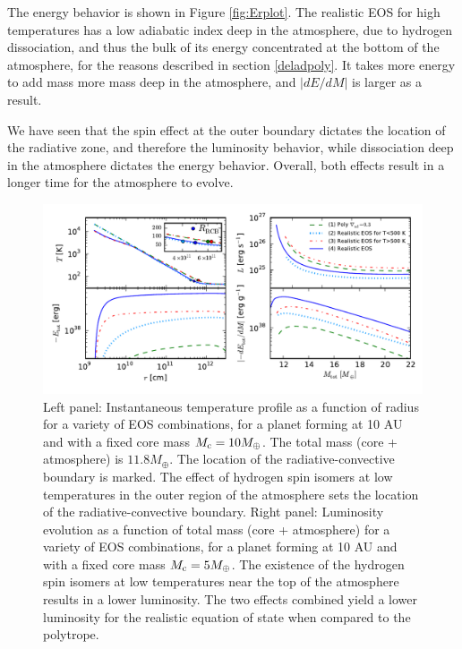 \documentclass[apj]{emulateapj}
\newcommand{\delad}{\nabla_{\rm ad}}
\begin{document}
The energy behavior is shown in Figure \ref{fig:Erplot}. The realistic EOS for high temperatures has a low adiabatic index deep in the atmosphere, due to hydrogen dissociation, and thus the bulk of its energy concentrated at the bottom of the atmosphere, for the reasons described in section \ref{deladpoly}. It takes more energy to add mass more mass deep in the atmosphere, and $|dE/dM|$ is larger as a result. 
%

We have seen that the spin effect at the outer boundary dictates the location of the radiative zone, and therefore the luminosity behavior, while dissociation deep in the atmosphere dictates the energy behavior. Overall, both effects result in a longer time for the atmosphere to evolve. 


\begin{figure}[tb]
\centering
\includegraphics[width=\textwidth]{../../figs/ModelAtmospheres/RadSelfGravRealEOS/PaperFigs/all_plot.pdf}
\caption{Left panel: Instantaneous temperature profile as a function of radius for a variety of EOS combinations, for a planet forming at 10 AU and with a fixed core mass $M_{\rm c}=10 M_{\oplus}$. The total mass (core + atmosphere) is $11.8 M_{\oplus}$. The location of the radiative-convective boundary is marked. The effect of hydrogen spin isomers at low temperatures in the outer region of the atmosphere sets the location of the radiative-convective boundary.  Right panel: Luminosity evolution as a function of total mass (core + atmosphere) for a variety of EOS combinations, for a planet forming at 10 AU and with a fixed core mass $M_{\rm c}=5 M_{\oplus}$. The existence of the hydrogen spin isomers at low temperatures near the top of the atmosphere results in a lower luminosity. The two effects combined yield a lower luminosity for the realistic equation of state when compared to the polytrope. }
\label{fig:TLrplot}
\end{figure}
\end{document}
